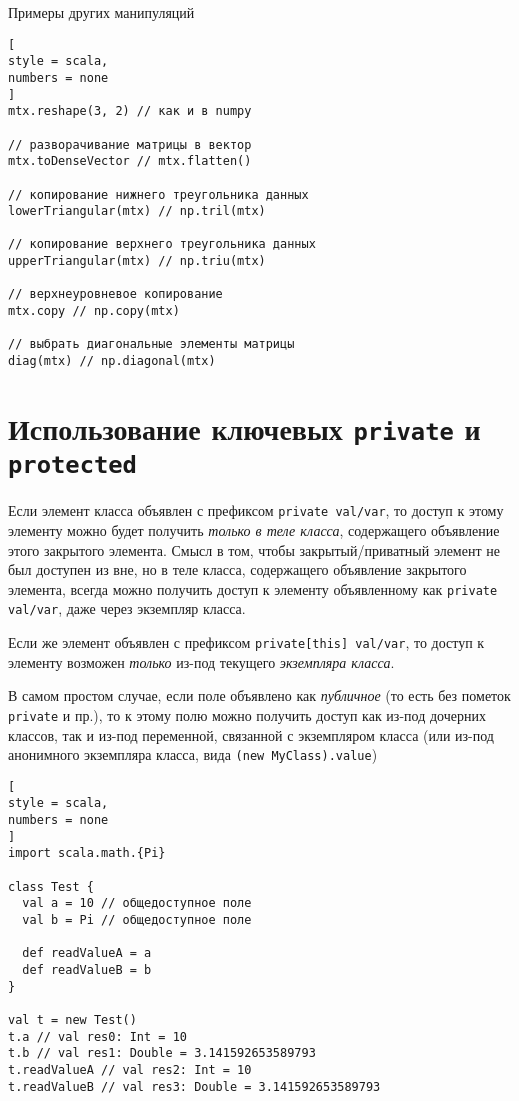 \documentclass[%
	11pt,
	a4paper,
	utf8,
		]{article}
\begin{document}
Примеры других манипуляций
\begin{lstlisting}[
style = scala,
numbers = none	
]
mtx.reshape(3, 2) // как и в numpy

// разворачивание матрицы в вектор
mtx.toDenseVector // mtx.flatten()

// копирование нижнего треугольника данных
lowerTriangular(mtx) // np.tril(mtx)

// копирование верхнего треугольника данных
upperTriangular(mtx) // np.triu(mtx)

// верхнеуровневое копирование
mtx.copy // np.copy(mtx)

// выбрать диагональные элементы матрицы
diag(mtx) // np.diagonal(mtx)
\end{lstlisting}

\section{Использование ключевых \texttt{private} и \texttt{protected}}

Если элемент класса объявлен с префиксом \texttt{private val/var}, то доступ к этому элементу можно будет получить \emph{только в теле класса}, содержащего объявление этого закрытого элемента. Смысл в том, чтобы закрытый/приватный элемент не был доступен из вне, но в теле класса, содержащего объявление закрытого элемента, всегда можно получить доступ к элементу объявленному как \texttt{private val/var}, даже через экземпляр класса.

Если же элемент объявлен с префиксом \texttt{private[this] val/var}, то доступ к элементу возможен \emph{только} из-под текущего \emph{экземпляра класса}.

В самом простом случае, если поле объявлено как \emph{публичное} (то есть без пометок \texttt{private} и пр.), то к этому полю можно получить доступ как из-под дочерних классов, так и из-под переменной, связанной с экземпляром класса (или из-под анонимного экземпляра класса, вида \texttt{(new MyClass).value})

\begin{lstlisting}[
style = scala,
numbers = none	
]
import scala.math.{Pi}

class Test {
  val a = 10 // общедоступное поле
  val b = Pi // общедоступное поле
  
  def readValueA = a
  def readValueB = b
}

val t = new Test()
t.a // val res0: Int = 10
t.b // val res1: Double = 3.141592653589793
t.readValueA // val res2: Int = 10
t.readValueB // val res3: Double = 3.141592653589793
\end{lstlisting}
\end{document}
